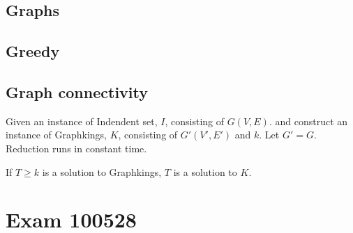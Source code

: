 \documentclass[a4paper]{article}
\newenvironment{task}[1]
{
	\begin{description}[align=right]
		\item [#1]
}{		%
	\end{description}
}
\DeclareMathOperator{\*}{\cdot}
\begin{document}
\begin{task}{4. (a)}
\end{task}

\begin{task}{(b)}
\end{task}

\subsection*{Graphs}

\begin{task}{5. (a)}
\end{task}

\begin{task}{(b)}
\end{task}

\begin{task}{(c)}
\end{task}

\begin{task}{(d)}
\end{task}

\begin{task}{(e)}
\end{task}

\subsection*{Greedy}

\begin{task}{6. (a)}
\end{task}

\subsection*{Graph connectivity}

\begin{task}{12. (f)}
	Given an instance of Indendent set, $I$, consisting of $G(V,E)$. and construct an instance of Graphkings, $K$, consisting of $G'(V',E')$ and $k$. Let $G'=G$. Reduction runs in constant time.
	
	If $T\geq k$ is a solution to Graphkings, $T$ is a solution to $K$.
\end{task}

\pagebreak
\section*{Exam 100528}
\end{document}
